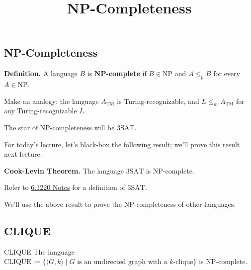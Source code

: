 \title{NP-Completeness}



\subsection{NP-Completeness}

\textbf{Definition.}
A language $B$ is \textbf{NP-complete}
if $B \in \mathrm{NP}$ and
$A \leq_p B$ for every $A \in \mathrm{NP}$.

\begin{remark}
    Make an analogy:
    the language $A_{\mathrm{TM}}$ is Turing-recognizable,
    and $L \leq_m A_{\mathrm{TM}}$ for any Turing-recognizable $L$.
\end{remark}

The star of NP-completeness will be $\mathrm{3SAT}$.

For today's lecture,
let's black-box the following result;
we'll prove this result next lecture.

\begin{boxed-text}
    \textbf{Cook-Levin Theorem.}
    The language $\mathrm{3SAT}$ is
    NP-complete.
\end{boxed-text}

\begin{remark}
    Refer to \href{/6.1220/lectures/14/}{6.1220 Notes}
    for a definition of $\mathrm{3SAT}$.
\end{remark}

We'll use the above result to prove the NP-completeness
of other languages.

\subsection{CLIQUE}

\begin{theorem}{CLIQUE}
    The language $\mathrm{CLIQUE} := \{
        \langle G, k \rangle \mid
        G \text{ is an undirected graph with a } k\text{-clique}
    \}$ is NP-complete.
\end{theorem}

